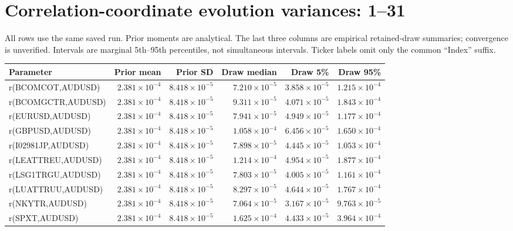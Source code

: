 \documentclass[10pt,a4paper]{article}
\begin{document}
\clearpage\section*{Correlation-coordinate evolution variances: 1--31}

\small All rows use the same saved run. Prior moments are analytical.
The last three columns are empirical retained-draw summaries; convergence is unverified.
Intervals are marginal 5th--95th percentiles, not simultaneous intervals.
Ticker labels omit only the common ``Index'' suffix.
\par\medskip
\begingroup\fontsize{7.8}{10.5}\selectfont\setlength{\tabcolsep}{3pt}
\renewcommand{\arraystretch}{1.45}
\begin{tabular*}{\linewidth}{@{\extracolsep{\fill}}lrrrrr@{}}
\toprule
Parameter & Prior mean & Prior SD & Draw median & Draw 5\% & Draw 95\%\\
\midrule
r(BCOMCOT,AUDUSD) & $2.381\times10^{-4}$ & $8.418\times10^{-5}$ & $7.210\times10^{-5}$ & $3.858\times10^{-5}$ & $1.215\times10^{-4}$ \\
r(BCOMGCTR,AUDUSD) & $2.381\times10^{-4}$ & $8.418\times10^{-5}$ & $9.311\times10^{-5}$ & $4.071\times10^{-5}$ & $1.843\times10^{-4}$ \\
r(EURUSD,AUDUSD) & $2.381\times10^{-4}$ & $8.418\times10^{-5}$ & $7.941\times10^{-5}$ & $4.949\times10^{-5}$ & $1.177\times10^{-4}$ \\
r(GBPUSD,AUDUSD) & $2.381\times10^{-4}$ & $8.418\times10^{-5}$ & $1.058\times10^{-4}$ & $6.456\times10^{-5}$ & $1.650\times10^{-4}$ \\
r(I02981JP,AUDUSD) & $2.381\times10^{-4}$ & $8.418\times10^{-5}$ & $7.898\times10^{-5}$ & $4.445\times10^{-5}$ & $1.053\times10^{-4}$ \\
r(LEATTREU,AUDUSD) & $2.381\times10^{-4}$ & $8.418\times10^{-5}$ & $1.214\times10^{-4}$ & $4.954\times10^{-5}$ & $1.877\times10^{-4}$ \\
r(LSG1TRGU,AUDUSD) & $2.381\times10^{-4}$ & $8.418\times10^{-5}$ & $7.803\times10^{-5}$ & $4.005\times10^{-5}$ & $1.161\times10^{-4}$ \\
r(LUATTRUU,AUDUSD) & $2.381\times10^{-4}$ & $8.418\times10^{-5}$ & $8.297\times10^{-5}$ & $4.644\times10^{-5}$ & $1.767\times10^{-4}$ \\
r(NKYTR,AUDUSD) & $2.381\times10^{-4}$ & $8.418\times10^{-5}$ & $7.064\times10^{-5}$ & $3.167\times10^{-5}$ & $9.763\times10^{-5}$ \\
r(SPXT,AUDUSD) & $2.381\times10^{-4}$ & $8.418\times10^{-5}$ & $1.625\times10^{-4}$ & $4.433\times10^{-5}$ & $3.964\times10^{-4}$ \\

\end{tabular*}
\end{document}

